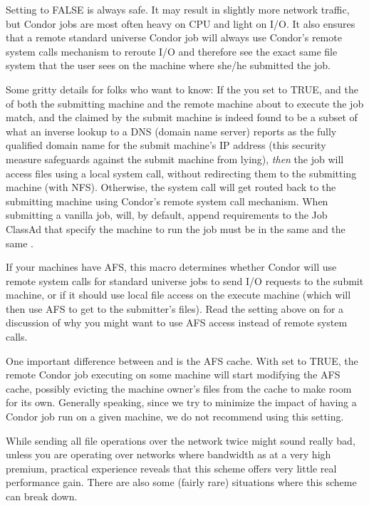 \begin{description}
  Setting  to FALSE is always safe.  It may result
  in slightly more network traffic, but Condor jobs are most often heavy
  on CPU and light on I/O.  It also ensures that a remote
  standard universe Condor job will always use Condor's remote system
  calls mechanism to reroute I/O and therefore see the exact same
  file system that the user sees on the machine where she/he submitted
  the job.
  
  Some gritty details for folks who want to know: If the you set
   to TRUE, and the  of
  both the submitting machine and the remote machine about to execute
  the job match, and the  claimed by the
  submit machine is indeed found to be a subset of what an inverse
  lookup to a DNS (domain name server) reports as the fully qualified
  domain name for the submit machine's IP address (this security
  measure safeguards against the submit machine from lying),
  \emph{then} the job will access files using a local system call,
  without redirecting them to the submitting machine (with
  NFS).  Otherwise, the system call will get routed back to the
  submitting machine using Condor's remote system call mechanism.
  \Note When submitting a vanilla job,  will, by default,
  append requirements to the Job ClassAd that specify the machine to run
  the job must be in the same  and the same
  .
  
\item[\Macro{USE\_AFS}] \label{param:UseAfs} If your machines have AFS,
  this
  macro determines whether Condor will use remote system calls for
  standard universe jobs to send I/O requests to the submit machine,
  or if it should use local file access on the execute machine (which
  will then use AFS to get to the submitter's files).  Read the
  setting above on  for a discussion of why you might
  want to use AFS access instead of remote system calls.
  
  One important difference between  and
   is the AFS cache.  With  set to
  TRUE, the remote Condor job executing on some machine will start
  modifying the AFS cache, possibly evicting the machine owner's
  files from the cache to make room for its own.  Generally speaking,
  since we try to minimize the impact of having a Condor job run on a
  given machine, we do not recommend using this setting.

  While sending all file operations over the network twice might sound
  really bad, unless you are operating over networks where bandwidth
  as at a very high premium, practical experience reveals that this
  scheme offers very little real performance gain.  There are also
  some (fairly rare) situations where this scheme can break down.
  

\end{description}

